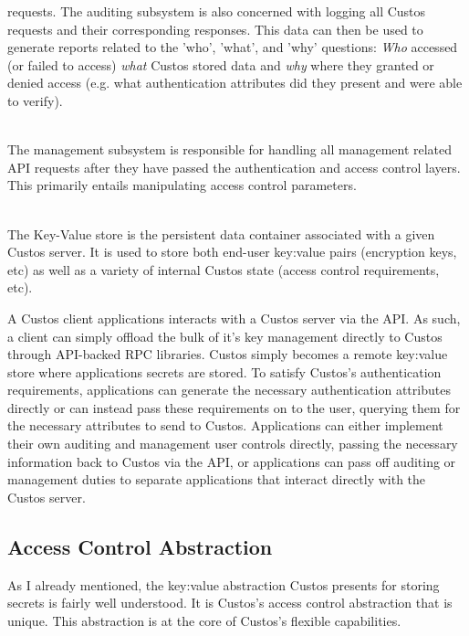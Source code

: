 \begin{packed_desc}
  requests. The auditing subsystem is also concerned with logging all
  Custos requests and their corresponding responses. This data can
  then be used to generate reports related to the 'who', 'what', and
  'why' questions: \emph{Who} accessed (or failed to access)
  \emph{what} Custos stored data and \emph{why} where they granted or
  denied access (e.g. what authentication attributes did they present
  and were able to verify).
\item[Management Subsystem] \hfill \\ The management subsystem is
  responsible for handling all management related API requests after
  they have passed the authentication and access control layers. This
  primarily entails manipulating access control parameters.
\item[Key-Value Store] \hfill \\ The Key-Value store is the persistent
  data container associated with a given Custos server. It is used to
  store both end-user key:value pairs (encryption keys, etc) as well
  as a variety of internal Custos state (access control requirements,
  etc).
\end{packed_desc}

A Custos client applications interacts with a Custos server via the
API. As such, a client can simply offload the bulk of it's key
management directly to Custos through API-backed RPC libraries. Custos
simply becomes a remote key:value store where applications secrets are
stored. To satisfy Custos's authentication requirements, applications
can generate the necessary authentication attributes directly or can
instead pass these requirements on to the user, querying them for the
necessary attributes to send to Custos. Applications can either
implement their own auditing and management user controls directly,
passing the necessary information back to Custos via the API, or
applications can pass off auditing or management duties to separate
applications that interact directly with the Custos server.

\subsection{Access Control Abstraction}

As I already mentioned, the key:value abstraction Custos presents for
storing secrets is fairly well understood. It is Custos's access
control abstraction that is unique. This abstraction is at the core of
Custos's flexible capabilities.

